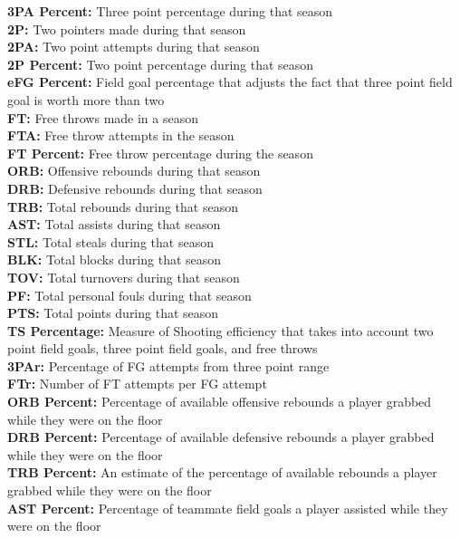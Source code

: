 \documentclass[11pt,letterpaper]{amsart}
\begin{document}
\textbf{3PA Percent:} Three point percentage during that season\\
\textbf{2P:} Two pointers made during that season\\
\textbf{2PA:} Two point attempts during that season\\
\textbf{2P Percent:} Two point percentage during that season\\
\textbf{eFG Percent:} Field goal percentage that adjusts the fact that three point field goal is worth more than two\\
\textbf{FT:} Free throws made in a season\\
\textbf{FTA:} Free throw attempts in the season\\
\textbf{FT Percent:} Free throw percentage during the season\\
\textbf{ORB:} Offensive rebounds during that season\\
\textbf{DRB:} Defensive rebounds during that season\\
\textbf{TRB:} Total rebounds during that season\\
\textbf{AST:} Total assists during that season\\
\textbf{STL:} Total steals during that season\\
\textbf{BLK:} Total blocks during that season\\
\textbf{TOV:} Total turnovers during that season\\
\textbf{PF:} Total personal fouls during that season\\
\textbf{PTS:} Total points during that season\\
\textbf{TS Percentage:} Measure of Shooting efficiency that takes into account two point field goals, three point field goals, and free throws\\
\textbf{3PAr:} Percentage of FG attempts from three point range\\
\textbf{FTr:} Number of FT attempts per FG attempt\\
\textbf{ORB Percent:} Percentage of available offensive rebounds a player grabbed while they were on the floor\\
\textbf{DRB Percent:} Percentage of available defensive rebounds a player grabbed while they were on the floor\\
\textbf{TRB Percent:} An estimate of the percentage of available rebounds a player grabbed while they were on the floor\\
\textbf{AST Percent:} Percentage of teammate field goals a player assisted while they were on the floor\\
\end{document}
